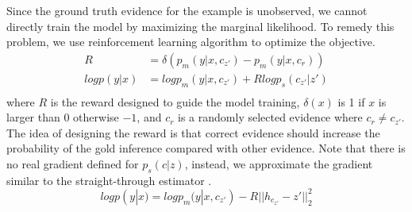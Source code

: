 \documentclass[11pt,a4paper]{article}
\begin{document}
Since the ground truth evidence for the example is unobserved, we cannot directly train the model by maximizing the marginal likelihood. To remedy this problem, we use reinforcement learning algorithm to optimize the objective.
\begin{equation}
\begin{aligned}
R&=\delta (p_m(y|x,c_{z'})-p_m(y|x,c_{r})) \\
logp(y|x)&=logp_m(y|x,c_{z'})+ Rlogp_s(c_{z'}|z') \\
\end{aligned}
\end{equation}
where $R$ is the reward designed to guide the model training, $\delta (x)$ is 1 if $x$ is larger than 0 otherwise $-1$, and $c_{r}$ is a randomly selected evidence where $c_{r}\neq c_{z'}$. 
The idea of designing the reward is that correct evidence should increase the probability of the gold inference compared with other evidence.
Note that there is no real gradient defined for $p_s(c|z)$, instead, we approximate the gradient similar to the straight-through estimator \cite{bengio2013estimating}.
\begin{equation}\label{logp(y|x)}
logp(y|x)=logp_m(y|x,c_{z'})- R||h_{c_{z'}}-z'||^2_2
\end{equation}
\end{document}
